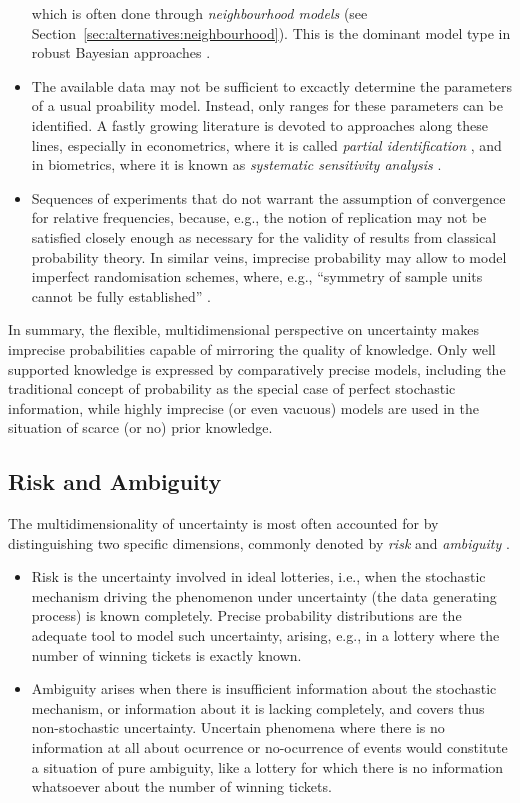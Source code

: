 \begin{itemize}
which is often done through \emph{neighbourhood models} (see Section~\ref{sec:alternatives:neighbourhood}).
This is the dominant model type in robust Bayesian approaches \parencite[see, e.g.,][]{1994:berger}.
\item The available data may not be sufficient to excactly determine the parameters of a usual proability model.
Instead, only ranges for these parameters can be identified.
A fastly growing literature is devoted to approaches along these lines,
especially in econometrics, where it is called \emph{partial identification} \parencite[e.g.,][]{2003:manski},
and in biometrics, where it is known as \emph{systematic sensitivity analysis} \parencite[e.g.,][]{vansteelandt2006}.
\item Sequences of experiments that do not warrant the assumption of convergence
for relative frequencies, because, e.g., the notion of replication may not be
satisfied closely enough as necessary for the validity of results from classical probability theory.
In similar veins, imprecise probability may allow to model
imperfect randomisation schemes, where, e.g., ``symmetry of sample units cannot be fully established''
\parencite[\S 2.5]{itip-statinf}.
\end{itemize}
In summary,
the flexible, multidimensional perspective on uncertainty makes imprecise probabilities capable of mirroring the quality of knowledge.
Only well supported knowledge is expressed by comparatively precise models,
including the traditional concept of probability as the special case of perfect stochastic information,
while highly imprecise (or even vacuous) models are used in the situation of scarce (or no) prior knowledge.

\subsection{Risk and Ambiguity}
\label{sec:motivation-riskambiguity}

The multidimensionality of uncertainty is most often accounted for
by distinguishing two specific dimensions,
commonly denoted by \emph{risk} and \emph{ambiguity} \parencite[e.g., by][]{1961:ellsberg}.

\begin{itemize}
\item Risk is the uncertainty involved in ideal lotteries,
i.e., when the stochastic mechanism driving the phenomenon under uncertainty
(the data generating process) is known completely.
Precise probability distributions are the adequate tool to model such uncertainty,
arising, e.g., in a lottery where the number of winning tickets is exactly known.
\item Ambiguity arises when there is insufficient information about the stochastic mechanism,
or information about it is lacking completely, and covers thus non-stochastic uncertainty.
Uncertain phenomena where there is no information at all
about ocurrence or no-ocurrence of events would constitute a situation of pure ambiguity,
like a lottery for which there is no information whatsoever about the number of winning tickets.
\end{itemize}

